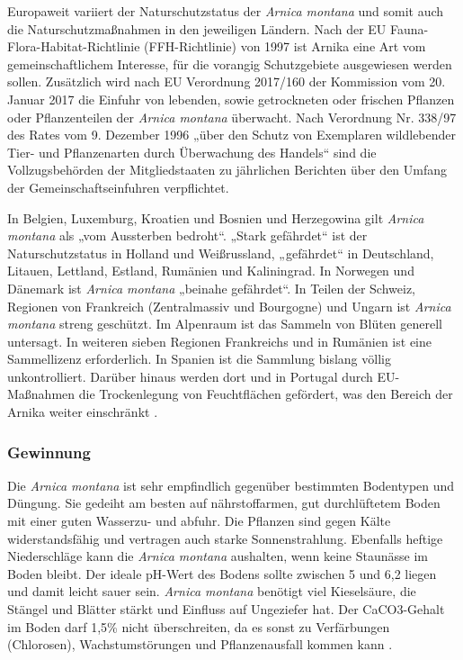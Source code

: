 
Europaweit variiert der Naturschutzstatus der \textit{Arnica montana} und somit auch die Naturschutzmaßnahmen in den jeweiligen Ländern. Nach der EU Fauna-Flora-Habitat-Richtlinie (FFH-Richtlinie) von 1997 ist Arnika eine Art vom gemeinschaftlichem Interesse, für die vorangig Schutzgebiete ausgewiesen werden sollen. Zusätzlich wird nach EU Verordnung 2017/160 der Kommission vom 20. Januar 2017 die Einfuhr von lebenden, sowie getrockneten oder frischen Pflanzen oder Pflanzenteilen der \textit{Arnica montana} überwacht. Nach Verordnung Nr. 338/97 des Rates vom 9. Dezember 1996 „über den Schutz von Exemplaren wildlebender Tier- und Pflanzenarten durch Überwachung des Handels“ sind die Vollzugsbehörden der Mitgliedstaaten zu jährlichen Berichten über den Umfang der Gemeinschaftseinfuhren verpflichtet. %

In Belgien, Luxemburg, Kroatien und Bosnien und Herzegowina gilt \textit{Arnica montana} als „vom Aussterben bedroht“. „Stark gefährdet“ ist der Naturschutzstatus in Holland und Weißrussland, „gefährdet“ in Deutschland, Litauen, Lettland, Estland, Rumänien und Kaliningrad. In Norwegen und Dänemark ist \textit{Arnica montana} „beinahe gefährdet“.
In Teilen der Schweiz, Regionen von Frankreich (Zentralmassiv und Bourgogne) und Ungarn ist \textit{Arnica montana} streng geschützt. Im Alpenraum ist das Sammeln von Blüten generell untersagt. In weiteren sieben Regionen Frankreichs und in Rumänien ist eine Sammellizenz erforderlich. In Spanien ist die Sammlung bislang völlig unkontrolliert. Darüber hinaus werden dort und in Portugal durch EU-Maßnahmen die Trockenlegung von Feuchtflächen gefördert, was den Bereich der Arnika weiter einschränkt \citep[vgl.][]{Franke2012}.

\subsubsection{Gewinnung}  

Die \textit{Arnica montana} ist sehr empfindlich gegenüber bestimmten Bodentypen und Düngung. Sie gedeiht am besten auf nährstoffarmen, gut durchlüftetem Boden mit einer guten Wasserzu- und abfuhr. Die Pflanzen sind gegen Kälte widerstandsfähig und vertragen auch starke Sonnenstrahlung. Ebenfalls heftige Niederschläge kann die \textit{Arnica montana} aushalten, wenn keine Staunässe im Boden bleibt. Der ideale pH-Wert des Bodens sollte zwischen 5 und 6,2 liegen und damit leicht sauer sein. \textit{Arnica montana} benötigt viel Kieselsäure, die Stängel und Blätter stärkt und Einfluss auf Ungeziefer hat. Der CaCO3-Gehalt im Boden darf 1,5\% nicht überschreiten, da es sonst zu Verfärbungen (Chlorosen), Wachstumstörungen und Pflanzenausfall kommen kann \citep[vgl.][]{Franke2012, FNR2013, Heeger1956}.


